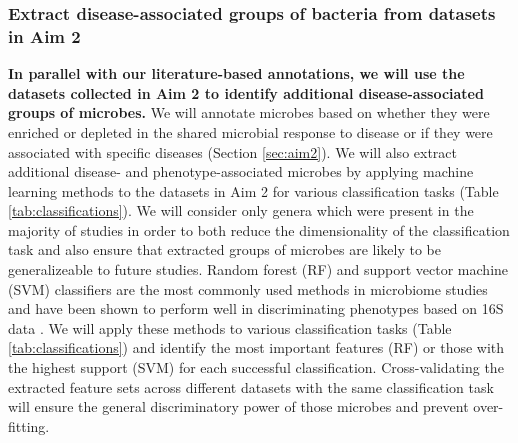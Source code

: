 \documentclass[12pt]{article}
\begin{document}
\subsubsection{Extract disease-associated groups of bacteria from datasets in Aim 2}
\textbf{In parallel with our literature-based annotations, 
we will use the datasets collected in Aim 2 to identify
additional disease-associated groups of microbes.} We will annotate microbes 
based on whether they were enriched or depleted in the shared microbial response to disease or if they were associated with specific diseases (Section \ref{sec:aim2}). 
We will also extract additional disease- and phenotype-associated microbes by 
applying machine learning methods to the datasets in Aim 2 for
various classification tasks (Table \ref{tab:classifications}). 
We will consider only genera which were present in the majority of studies 
in order to both reduce the dimensionality of the classification 
task and also ensure that extracted groups of microbes
are likely to be generalizeable to future studies. Random forest (RF) and support
vector machine (SVM) classifiers are the most commonly used methods in
microbiome studies and have been shown to perform well in discriminating
phenotypes based on 16S data \cite{ibd-papa, knights-supervised-2010, pasolli-meta_analysis-2016}. 
We will apply these methods to various classification tasks (Table \ref{tab:classifications})
and identify the most important features (RF) or those with the highest support (SVM)
for each successful classification.
Cross-validating the extracted feature sets across different datasets with the same
classification task will ensure the general discriminatory 
power of those microbes and prevent over-fitting.
\end{document}
